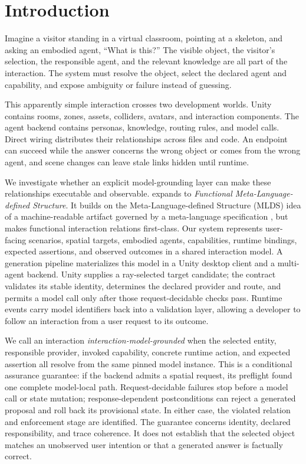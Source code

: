 \section{Introduction}

Imagine a visitor standing in a virtual classroom, pointing at a skeleton, and
asking an embodied agent, ``What is this?'' The visible object, the visitor's
selection, the responsible agent, and the relevant knowledge are all part of the
interaction. The system must resolve the object, select the declared agent and
capability, and expose ambiguity or failure instead of guessing.

This apparently simple interaction crosses two development worlds. Unity
contains rooms, zones, assets, colliders, avatars, and interaction components.
The agent backend contains personas, knowledge, routing rules, and model calls.
Direct wiring distributes their relationships across files and code. An
endpoint can succeed while the answer concerns the wrong object or comes from
the wrong agent, and scene changes can leave stale links hidden until runtime.

We investigate whether an explicit model-grounding layer can make these
relationships executable and observable. \systemname{} expands to
\emph{Functional Meta-Language-defined Structure}. It builds on the
Meta-Language-defined Structure (MLDS) idea of a machine-readable artifact
governed by a meta-language specification \cite{fischer2025machinereadable},
but makes functional interaction relations first-class. Our system represents
user-facing scenarios, spatial targets, embodied agents, capabilities, runtime
bindings, expected assertions, and observed outcomes in a shared interaction
model. A generation pipeline materializes this model in a Unity desktop client
and a multi-agent backend. Unity supplies a ray-selected target candidate; the
contract validates its stable identity, determines the declared provider and
route, and permits a model call only after those request-decidable checks pass.
Runtime events
carry model identifiers back into a validation layer, allowing a developer to
follow an interaction from a user request to its outcome.

We call an interaction \emph{interaction-model-grounded} when the selected
entity, responsible provider, invoked capability, concrete runtime action, and
expected assertion all resolve from the same pinned model instance. This is a
conditional assurance guarantee: if the backend admits a spatial request, its
preflight found one complete model-local path. Request-decidable failures stop
before a model call or state mutation; response-dependent postconditions can
reject a generated proposal and roll back its provisional state. In either
case, the violated relation and enforcement stage are identified. The guarantee
concerns identity, declared responsibility, and trace coherence. It
does not establish that the selected object matches an unobserved user
intention or that a generated answer is factually correct.

